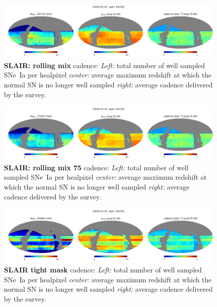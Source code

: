\begin{figure}[h!]
  \begin{center}
    \includegraphics[width=\linewidth]{Figures/rolling_mix_10yrs_64_maps.png}
    \caption{{\bf SLAIR: rolling mix} cadence: {\em Left:} total number of well
      sampled SNe~Ia per healpixel {\em center:} average maximum
      redshift at which the normal SN is no longer well sampled {\em
        right:} average cadence delivered by the survey.}
  \end{center}
\end{figure}

\begin{figure}[h!]
  \begin{center}
    \includegraphics[width=\linewidth]{Figures/rolling_mix_75_10yrs_64_maps.png}
    \caption{{\bf SLAIR: rolling mix 75} cadence: {\em Left:} total number of well
      sampled SNe~Ia per healpixel {\em center:} average maximum
      redshift at which the normal SN is no longer well sampled {\em
        right:} average cadence delivered by the survey.}
  \end{center}
\end{figure}

\begin{figure}[h!]
  \begin{center}
    \includegraphics[width=\linewidth]{Figures/tight_mask_10yrs_64_maps.png}
    \caption{{\bf SLAIR tight mask} cadence: {\em Left:} total number of well
      sampled SNe~Ia per healpixel {\em center:} average maximum
      redshift at which the normal SN is no longer well sampled {\em
        right:} average cadence delivered by the survey.}
  \end{center}
\end{figure}

